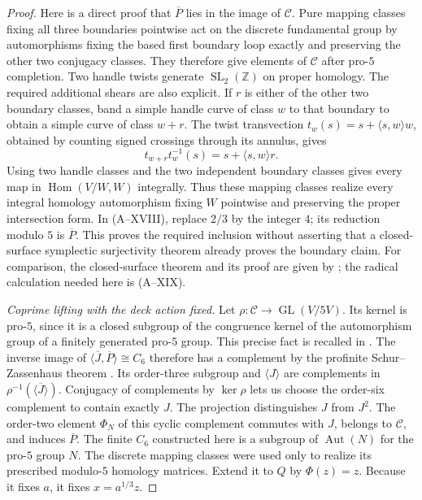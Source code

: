 \begin{proof}
Here is a direct proof that $\overline P$ lies in the
image of $\mathcal C$. Pure mapping classes fixing
all three boundaries pointwise act on the discrete
fundamental group by automorphisms fixing the based
first boundary loop exactly and preserving the other
two conjugacy classes. They therefore give elements
of $\mathcal C$ after pro-$5$ completion. Two handle
twists generate $\operatorname{SL}_2(\mathbb Z)$
on proper homology. The required additional shears
are also explicit. If $r$ is either of the other
two boundary classes, band a simple handle curve
of class $w$ to that boundary to obtain a simple
curve of class $w+r$. The twist transvection
$t_w(s)=s+\langle s,w\rangle w$, obtained by counting
signed crossings through its annulus, gives
\[
 t_{w+r}t_w^{-1}(s)=s+\langle s,w\rangle r.                    \tag{A--XIX}
\]
Using two handle classes and the two independent
boundary classes gives every map in
$\operatorname{Hom}(V/W,W)$ integrally. Thus these
mapping classes realize every integral homology
automorphism fixing $W$ pointwise and preserving
the proper intersection form. In (A--XVIII), replace
$2/3$ by the integer $4$; its reduction modulo $5$
is $\overline P$. This proves the required inclusion
without asserting that a closed-surface symplectic
surjectivity theorem already proves the boundary
claim. For comparison, the closed-surface theorem
and its proof are given by
\citet[Theorem 0.1]{A_PutmanSymplectic}; the radical
calculation needed here is (A--XIX).

\emph{Coprime lifting with the deck action fixed.}
Let $\rho:\mathcal C\to\operatorname{GL}(V/5V)$.
Its kernel is pro-$5$, since it is a closed subgroup
of the congruence kernel of the automorphism group
of a finitely generated pro-$5$ group. This precise
fact is recalled in
\citet[\S2, preceding Definition 2.1]{A_HajirMaire2016}.
The inverse image of
$\langle\overline J,\overline P\rangle\cong C_6$
therefore has a complement by the profinite
Schur--Zassenhaus theorem
\citep[Theorem 2.5]{A_HajirMaire2016}.
Its order-three subgroup and $\langle J\rangle$
are complements in $\rho^{-1}(\langle\overline J\rangle)$.
Conjugacy of complements by $\ker\rho$ lets us
choose the order-six complement to contain exactly
$J$. The projection distinguishes $J$ from $J^2$.
The order-two element $\Phi_N$ of this cyclic
complement commutes with $J$, belongs to
$\mathcal C$, and induces $\overline P$.
The finite $C_6$ constructed here is a subgroup
of $\operatorname{Aut}(N)$ for the pro-$5$ group
$N$. The discrete mapping classes were used only
to realize its prescribed modulo-$5$ homology matrices.
Extend it to $Q$ by $\Phi(z)=z$.
Because it fixes $a$, it fixes $x=a^{1/3}z$.


\end{proof}
